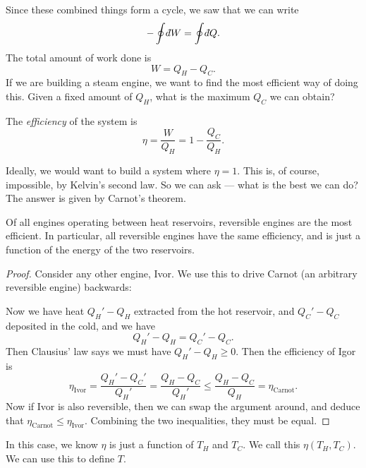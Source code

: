 \documentclass[a4paper]{article}
\def\di{{\mathchar'26\mkern-12mu d}}
\begin{document}
Since these combined things form a cycle, we saw that we can write
\[
  - \oint \di W = \oint \di Q.
\]
The total amount of work done is
\[
  W = Q_H - Q_C.
\]
If we are building a steam engine, we want to find the most efficient way of doing this. Given a fixed amount of $Q_H$, what is the maximum $Q_C$ we can obtain?

\begin{defi}[Efficiency]
  The \emph{efficiency} of the system is
  \[
    \eta = \frac{W}{Q_H} = 1 - \frac{Q_C}{Q_H}.
  \]
\end{defi}
Ideally, we would want to build a system where $\eta = 1$. This is, of course, impossible, by Kelvin's second law. So we can ask --- what is the best we can do? The answer is given by Carnot's theorem.

\begin{thm}
  Of all engines operating between heat reservoirs, reversible engines are the most efficient. In particular, all reversible engines have the same efficiency, and is just a function of the energy of the two reservoirs.
\end{thm}

\begin{proof}
  Consider any other engine, Ivor. We use this to drive Carnot (an arbitrary reversible engine) backwards:
  \begin{center}
  \end{center}
  Now we have heat $Q_H' - Q_H$ extracted from the hot reservoir, and $Q_C' - Q_C$ deposited in the cold, and we have
  \[
     Q_H' - Q_H = Q_C' - Q_C.
  \]
  Then Clausius' law says we must have $Q_H' - Q_H \geq 0$. Then the efficiency of Igor is
  \[
    \eta_{\mathrm{Ivor}} = \frac{Q_H' - Q_C'}{Q_H'} = \frac{Q_H - Q_C}{Q_H'} \leq \frac{Q_H - Q_C}{Q_H} = \eta_{\mathrm{Carnot}}.
  \]
  Now if Ivor is also reversible, then we can swap the argument around, and deduce that $\eta_{\mathrm{Carnot}} \leq \eta_{\mathrm{Ivor}}$. Combining the two inequalities, they must be equal.
\end{proof}
In this case, we know $\eta$ is just a function of $T_H$ and $T_C$. We call this $\eta(T_H, T_C)$. We can use this to define $T$.
\end{document}

